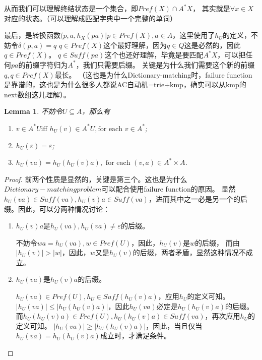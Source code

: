 \documentclass[UTF8]{ctexart}
\newtheorem{lem}[thm]{Lemma}
\theoremstyle{definition}
\theoremstyle{remark}
\numberwithin{equation}{subsection}
\begin{document}
	从而我们可以理解终结状态是一个集合，即$Pref(X) \cap A^*X$，
	其实就是$\forall x \in X$对应的状态。（可以理解成匹配字典中一个完整的单词）
	
	最后，是转换函数${(p,a,h_X(pa) | p \in Pref(X), a \in A}$，这里使用了$h_U$的定义，不妨令$\delta(p,a)=q$
	$q \in Pref(X)$这个最好理解，因为$q \in Q$这是必然的，因此$q \in Pref(X)$。
	$q \in Suff(pa)$这个也还好理解，毕竟是要匹配$A^*X$，可以把任何$pa$的前缀字符归为$A^*$，我们只需要后缀。
	关键是为什么我们需要这个新的前缀$q, q \in Pref(X)$最长。
	（这也是为什么Dictionary-matching时，failure function是靠谱的，这也是为什么很多人都说AC自动机=trie+kmp，确实可以从kmp的next数组这儿理解）。
	
	\begin{lem}
		不妨令$U \subseteq A$，那么有
		\begin{enumerate}[(1)]
			\item $v \in A^*U \text{iff } h_U(v) \in A^*U, \text{for each } v \in A^*$;
			\item $h_U(\varepsilon) = \varepsilon$;
			\item $h_U(va) = h_U(h_U(v)a), \text{ for each } (v, a) \in A^* \times A$.
		\end{enumerate}
	\end{lem}
	\begin{proof}
		前两个性质是显然的，关键是第三个。这也是为什么$Dictionary-matching problem$可以配合使用failure function的原因。
		显然$h_U(va) \in Suff(va), h_U(v)a \in Suff(va)$，进而其中之一必是另一个的后缀。因此，可以分两种情况讨论：
		\begin{enumerate}[(1)]
			\item $h_U(v)a$是$h_U(va), h_U(va) \neq \varepsilon$的后缀。
			
			不妨令$wa = h_U(va), w \in Pref(U)$，因此，$h_U(v)$是$w$的后缀，
			而由$|h_U(v)| > |w|$，因此，$w$又是$h_U(v)$的后缀，两者矛盾，显然这种情况不成立。
			
			\item $h_U(va)$是$h_U(v)a$的后缀。
			
			$h_U(va) \in Pref(U), h_U \in Suff(h_U(v)a)$，应用$h_U$的定义可知。
			$|h_U(va)| \le |h_U(h_U(v)a)|$，因此$h_U(va)$必定是$h_U(h_U(v)a)$的后缀。
			而$h_U(h_U(v)a) \in Pref(U), h_U(h_U(v)a) \in Suff(va)$，再次应用$h_U$的定义可知。
			$|h_U(va)| \ge |h_U(h_U(v)a)|$，因此，当且仅当$h_U(va) = h_U(h_U(v)a)$成立时，才满足条件。
			
		\end{enumerate}
	\end{proof}
\end{document}
